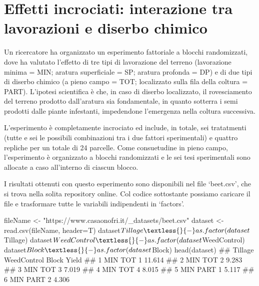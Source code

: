 \documentclass[a4paper,12pt,oneside]{book}
\newenvironment{Shaded}{\begin{snugshade}}{\end{snugshade}}
\newcommand{\SpecialCharTok}[1]{#1}
\newcommand{\StringTok}[1]{#1}
\newcommand{\DocumentationTok}[1]{#1}
\newcommand{\OtherTok}[1]{#1}
\newcommand{\FunctionTok}[1]{#1}
\newcommand{\AttributeTok}[1]{#1}
\newcommand{\NormalTok}[1]{#1}
\begin{document}
\hypertarget{effetti-incrociati-interazione-tra-lavorazioni-e-diserbo-chimico}{%
\section{Effetti incrociati: interazione tra lavorazioni e diserbo chimico}\label{effetti-incrociati-interazione-tra-lavorazioni-e-diserbo-chimico}}

Un ricercatore ha organizzato un esperimento fattoriale a blocchi randomizzati, dove ha valutato l'effetto di tre tipi di lavorazione del terreno (lavorazione minima = MIN; aratura superficiale = SP; aratura profonda = DP) e di due tipi di diserbo chimico (a pieno campo = TOT; localizzato sulla fila della coltura = PART). L'ipotesi scientifica è che, in caso di diserbo localizzato, il rovesciamento del terreno prodotto dall'aratura sia fondamentale, in quanto sotterra i semi prodotti dalle piante infestanti, impedendone l'emergenza nella coltura successiva.

L'esperimento è completamente incrociato ed include, in totale, sei tratatmenti (tutte e sei le possibili combinazioni tra i due fattori sperimentali) e quattro repliche per un totale di 24 parcelle. Come consuetudine in pieno campo, l'esperimento è organizzato a blocchi randomizzati e le sei tesi sperimentali sono allocate a caso all'interno di ciascun blocco.

I risultati ottenuti con questo esperimento sono disponibili nel file `beet.csv', che si trova nella solita repository online. Col codice sottostante possiamo caricare il file e trasformare tutte le variabili indipendenti in `factors'.

\begin{Shaded}
\begin{Highlighting}[]
\NormalTok{fileName }\OtherTok{\textless{}{-}} \StringTok{"https://www.casaonofri.it/\_datasets/beet.csv"}
\NormalTok{dataset }\OtherTok{\textless{}{-}} \FunctionTok{read.csv}\NormalTok{(fileName, }\AttributeTok{header=}\NormalTok{T)}
\NormalTok{dataset}\SpecialCharTok{$}\NormalTok{Tillage }\OtherTok{\textless{}{-}} \FunctionTok{as.factor}\NormalTok{(dataset}\SpecialCharTok{$}\NormalTok{Tillage)}
\NormalTok{dataset}\SpecialCharTok{$}\NormalTok{WeedControl }\OtherTok{\textless{}{-}} \FunctionTok{as.factor}\NormalTok{(dataset}\SpecialCharTok{$}\NormalTok{WeedControl)}
\NormalTok{dataset}\SpecialCharTok{$}\NormalTok{Block }\OtherTok{\textless{}{-}} \FunctionTok{as.factor}\NormalTok{(dataset}\SpecialCharTok{$}\NormalTok{Block)}
\FunctionTok{head}\NormalTok{(dataset)}
\DocumentationTok{\#\#   Tillage WeedControl Block  Yield}
\DocumentationTok{\#\# 1     MIN         TOT     1 11.614}
\DocumentationTok{\#\# 2     MIN         TOT     2  9.283}
\DocumentationTok{\#\# 3     MIN         TOT     3  7.019}
\DocumentationTok{\#\# 4     MIN         TOT     4  8.015}
\DocumentationTok{\#\# 5     MIN        PART     1  5.117}
\DocumentationTok{\#\# 6     MIN        PART     2  4.306}
\end{Highlighting}
\end{Shaded}
\end{document}
